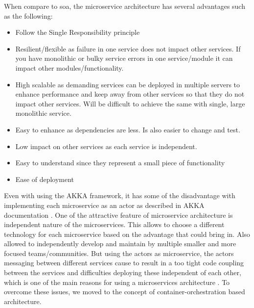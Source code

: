 When compare to \acrshort{soa}, the microservice architecture has several advantages such as the following:
\begin{itemize}
    \item Follow the Single Responsibility principle
    \item Resilient/flexible as failure in one service does not impact other services. If you have monolithic or bulky service errors in one service/module it can impact other modules/functionality.
    \item High scalable as demanding services can be deployed in multiple servers to enhance performance and keep away from other services so that they do not impact other services. Will be difficult to achieve the same with single, large monolithic service.
    \item Easy to enhance as dependencies are less. Is also easier to change and test.
    \item Low impact on other services as each service is independent. %
    \item Easy to understand since they represent a small piece of functionality
    \item Ease of deployment
\end{itemize}


Even with using the AKKA framework, it has some of the disadvantage with implementing each microservice as an actor as described in AKKA documentation \cite{Akka.ioWhenCluster}. One of the attractive feature of microservice architecture is independent nature of the microservices. This allows to choose a different technology for each microservice based on the advantage that could bring in. Also allowed to independently develop and maintain by multiple smaller and more focused teams/communities. But using the actors as microservice, the actors messaging between different services cause to result in a too tight code coupling between the services and difficulties deploying these independent of each other, which is one of the main reasons for using a microservices architecture \cite{Akka.ioWhenCluster}. To overcome these issues, we moved to the concept of container-orchestration based architecture.

